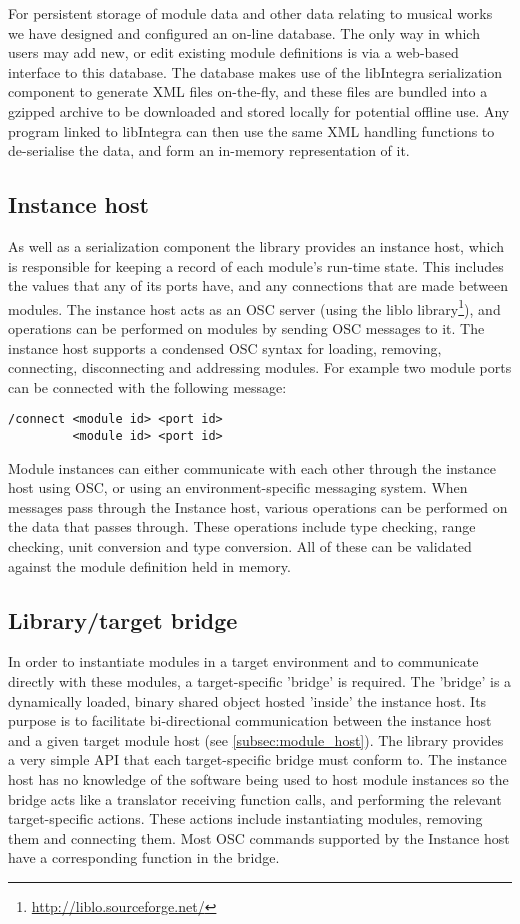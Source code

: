 For persistent storage of module data and other data relating to musical works we have designed and configured an on-line database. The only way in which users may add new, or edit existing module definitions is via a web-based interface to this database. The database makes use of the libIntegra serialization component to generate XML files on-the-fly, and these files are bundled into a gzipped archive to be downloaded and stored locally for potential offline use. Any program linked to libIntegra can then use the same XML handling functions to de-serialise the data, and form an in-memory representation of it.

\subsection{Instance host}\label{subsec:instance_host}

As well as a serialization component the library provides an instance
host, which is responsible for keeping a record of each module's
run-time state. This includes the values that any of its ports have,
and any connections that are made between modules. The instance host
acts as an OSC server (using the liblo
library\footnote{\url{http://liblo.sourceforge.net/}}), and operations
can be performed on modules by sending OSC messages to it. The
instance host supports a condensed OSC syntax for loading, removing,
connecting, disconnecting and addressing modules. For example two
module ports can be connected with the following message: 
\begin{verbatim}
/connect <module id> <port id> 
         <module id> <port id>
\end{verbatim}

Module instances can either communicate with each other through the instance host using OSC, or using an environment-specific messaging system. When messages pass through the Instance host, various operations can be performed on the data that passes through. These operations include type checking, range checking, unit conversion and type conversion. All of these can be validated against the module definition held in memory.
 
\subsection{Library/target bridge}\label{subsec:bridge}

In order to instantiate modules in a target environment and to communicate directly with these modules, a target-specific 'bridge' is required. The 'bridge' is a dynamically loaded, binary shared object hosted 'inside' the instance host. Its purpose is to facilitate bi-directional communication between the instance host and a given target module host (see \ref{subsec:module_host}). The library provides a very simple API that each target-specific bridge must conform to. The instance host has no knowledge of the software being used to host module instances so the bridge acts like a translator receiving function calls, and performing the relevant target-specific actions. These actions include instantiating modules, removing them and connecting them. Most OSC commands supported by the Instance host have a corresponding function in the bridge.

